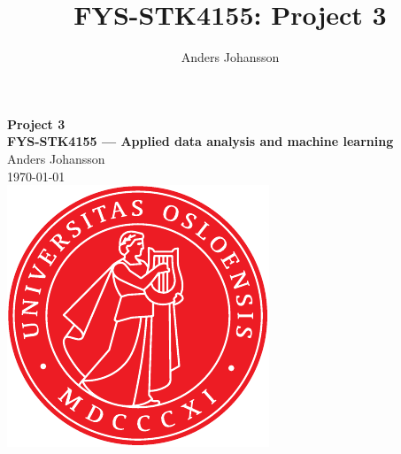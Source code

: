 \documentclass[11pt,british,a4paper]{article}
\numberwithin{equation}{section}
\begin{document}
\tikzexternaldisable
\title{FYS-STK4155: Project 3}
\author{Anders Johansson}

\begin{titlepage}
\vspace*{\fill}
\begin{center}
\textsf{
    \Huge \textbf{Project 3}\\\vspace{0.5cm}
    \Large \textbf{FYS-STK4155 --- Applied data analysis and machine learning}\\
    \vspace{8cm}
    Anders Johansson\\
    \today\\
}
\vspace{1.5cm}
\includegraphics{uio.pdf}\\
\vspace*{\fill}
\end{center}
\end{titlepage}
\null
\pagestyle{empty}
\newpage

\pagestyle{fancy}
\setcounter{page}{1}
\end{document}
